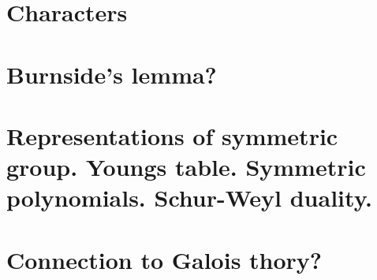 \documentclass{amsart}
\begin{document}
\section{Characters}

\section{Burnside's lemma?}

\section{Representations of symmetric group. Youngs table. Symmetric polynomials. Schur-Weyl duality. }

\section{Connection to Galois thory?}
\end{document}
